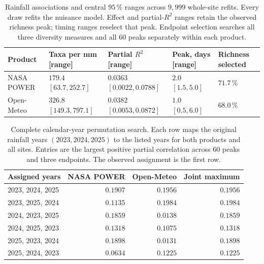 \begin{table}[H]\centering\small
\caption{Rainfall associations and central $95\,\%$ ranges across $9{,}999$ whole-site refits. Every draw refits the nuisance model. Effect and partial-$R^2$ ranges retain the observed richness peak; timing ranges reselect that peak. Endpoint selection searches all three diversity measures and all $60$ peaks separately within each product.}
\label{tab:rain-pulse-uncertainty}
\begin{tabular}{P{2cm}P{3cm}P{3cm}P{2.5cm}P{2cm}}\toprule
Product & Taxa per mm [range] & Partial $R^2$ [range] & Peak, days [range] & Richness selected \\\midrule
NASA POWER & $179.4$ $[63.7,252.7]$ & $0.0363$ $[0.0022,0.0788]$ & $2.0$ $[1.5,5.0]$ & $71.7\,\%$ \\
Open-Meteo & $326.8$ $[149.3,797.1]$ & $0.0382$ $[0.0053,0.0872]$ & $1.0$ $[0.5,6.0]$ & $68.0\,\%$ \\
\bottomrule\end{tabular}\end{table}
\begin{table}[H]\centering\small
\caption{Complete calendar-year permutation search. Each row maps the original rainfall years $(2023,2024,2025)$ to the listed years for both products and all sites. Entries are the largest positive partial correlation across $60$ peaks and three endpoints. The observed assignment is the first row.}
\label{tab:rain-calendar-orbit}
\begin{tabular}{lrrr}\toprule
Assigned years & NASA POWER & Open-Meteo & Joint maximum \\\midrule
2023, 2024, 2025 & $0.1907$ & $0.1956$ & $0.1956$ \\
2023, 2025, 2024 & $0.1135$ & $0.1984$ & $0.1984$ \\
2024, 2023, 2025 & $0.1859$ & $0.0138$ & $0.1859$ \\
2024, 2025, 2023 & $0.1318$ & $0.1075$ & $0.1318$ \\
2025, 2023, 2024 & $0.1898$ & $0.0131$ & $0.1898$ \\
2025, 2024, 2023 & $0.0634$ & $0.1225$ & $0.1225$ \\
\bottomrule\end{tabular}\end{table}
